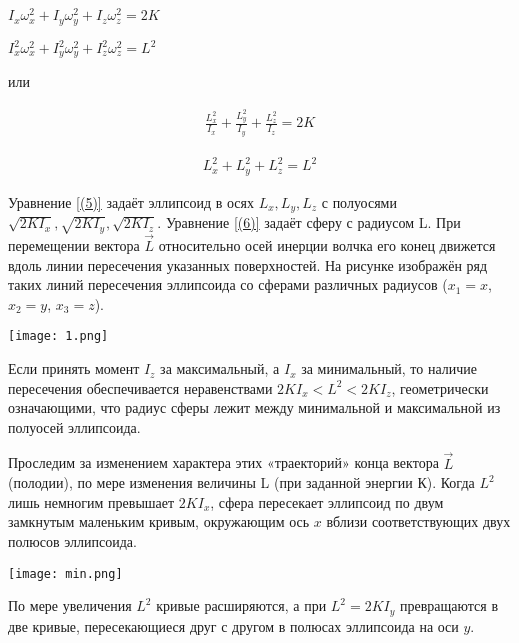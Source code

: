 \documentclass{article}
\begin{document}
\begin{center}
$I_x\omega_x^2 + I_y\omega_y^2 + I_z\omega_z^2 = 2K$
\end{center}
\begin{center}
$I_x^2\omega_x^2 + I_y^2\omega_y^2 + I_z^2\omega_z^2 = L^2$
\end{center}

или

\begin{equation} 
\begin{gathered}
\label{(5)}
\frac{L_x^2}{I_x} + \frac{L_y^2}{I_y} + \frac{L_z^2}{I_z} = 2K
\end{gathered}
\end{equation}

\begin{equation} 
\begin{gathered}
\label{(6)}
L_x^2 + L_y^2 + L_z^2 = L^2
\end{gathered}
\end{equation}

Уравнение \ref{(5)} задаёт эллипсоид в осях $L_x, L_y, L_z$ с полуосями $\sqrt{2KI_x}, \sqrt{2KI_y}, \sqrt{2KI_z}$. Уравнение \ref{(6)} задаёт сферу с радиусом L. При перемещении вектора $\vec{L}$ относительно осей инерции волчка его конец движется вдоль линии пересечения указанных поверхностей. На рисунке изображён ряд таких линий пересечения эллипсоида со сферами различных радиусов ($x_1 = x$, $x_2 = y$, $x_3 = z$).

\begin{center}
\texttt{[image: 1.png]}
\end{center}

Если принять момент $I_z$ за максимальный, а $I_x$ за минимальный, то наличие пересечения обеспечивается неравенствами $2KI_x <  L^2 < 2KI_z$, геометрически означающими, что радиус сферы лежит между минимальной и максимальной из полуосей эллипсоида. 

Проследим за изменением характера этих «траекторий» конца вектора $\vec{L}$ (полодии), по мере изменения величины L (при заданной энергии К). Когда $L^2$ лишь немногим превышает $2KI_x$, сфера пересекает эллипсоид по двум замкнутым маленьким кривым, окружающим ось $x$ вблизи соответствующих двух полюсов эллипсоида.

\begin{center}
\texttt{[image: min.png]}
\end{center}

По мере увеличения $L^2$ кривые расширяются, а при $L^2 = 2KI_y$ превращаются в две кривые, пересекающиеся друг с другом в полюсах эллипсоида на оси $y$.
\end{document}
